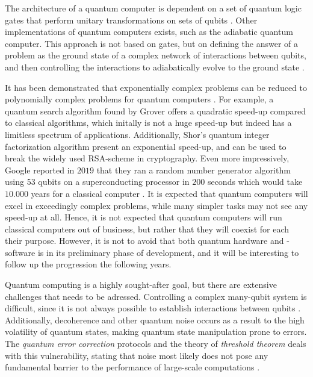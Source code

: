 The architecture of a quantum computer is dependent on a set of quantum logic gates that perform unitary transformations on sets of qubits \cite{DiVincenzo2000, Ladd2010}. Other implementations of quantum computers exists, such as the adiabatic quantum computer. This approach is not based on gates, but on defining the answer of a problem as the ground state of a complex network of interactions between qubits, and then controlling the interactions to adiabatically evolve to the ground state \cite{Mizel2007}.

It has been demonstrated that exponentially complex problems can be reduced to polynomially complex problems for quantum computers \cite{Pavicic2006}. For example, a quantum search algorithm found by Grover \cite{Grover1997} offers a quadratic speed-up compared to classical algorithms, which initally is not a huge speed-up but indeed has a limitless spectrum of applications. Additionally, Shor's quantum integer factorization algorithm \cite{Shor1994} present an exponential speed-up, and can be used to break the widely used RSA-scheme in cryptography. Even more impressively, Google reported in $2019$ that they ran a random number generator algorithm using 53 qubits on a superconducting processor in $200$ seconds which would take $10.000$ years for a classical computer \cite{Martinis2019}. It is expected that quantum computers will excel in exceedingly complex problems, while many simpler tasks may not see any speed-up at all. Hence, it is not expected that quantum computers will run classical computers out of business, but rather that they will coexist for each their purpose. However, it is not to avoid that both quantum  hardware and -software is in its preliminary phase of development, and it will be interesting to follow up the progression the following years.

Quantum computing is a highly sought-after goal, but there are extensive challenges that needs to be adressed. Controlling a complex many-qubit system is difficult, since it is not always possible to establish interactions between qubits \cite{DiVincenzo2000}. Additionally, decoherence and other quantum noise occurs as a result to the high volatility of quantum states, making quantum state manipulation prone to errors. The \textit{quantum error correction} protocols and the theory of \textit{threshold theorem} deals with this vulnerability, stating that noise most likely does not pose any fundamental barrier to the performance of large-scale computations \cite{Pavicic2006}.


